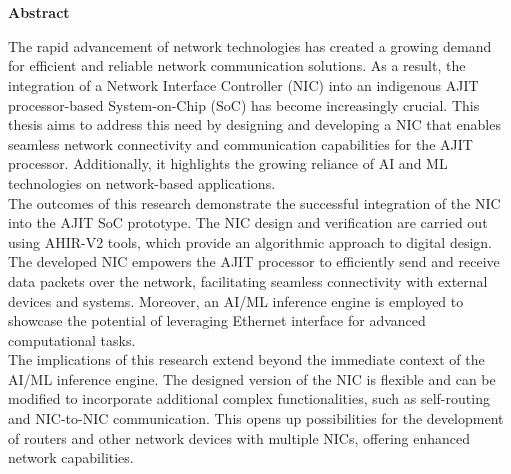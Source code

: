 \documentclass[12pt]{report}
\begin{document}
\newpage
\chapter*{}
\begin{center}
{\Large \textbf{Abstract}}
\end{center}
The rapid advancement of network technologies has created a growing demand for efficient and reliable network communication solutions. As a result, the integration of a Network Interface Controller (NIC) into an indigenous AJIT processor-based System-on-Chip (SoC) has become increasingly crucial. This thesis aims to address this need by designing and developing a NIC that enables seamless network connectivity and communication capabilities for the AJIT processor. Additionally, it highlights the growing reliance of AI and ML technologies on network-based applications.\\

The outcomes of this research demonstrate the successful integration of the NIC into the AJIT SoC prototype. The NIC design and verification are carried out using AHIR-V2 tools, which provide an algorithmic approach to digital design. The developed NIC empowers the AJIT processor to efficiently send and receive data packets over the network, facilitating seamless connectivity with external devices and systems. Moreover, an AI/ML inference engine is employed to showcase the potential of leveraging Ethernet interface for advanced computational tasks.\\

The implications of this research extend beyond the immediate context of the AI/ML inference engine. The designed version of the NIC is flexible and can be modified to incorporate additional complex functionalities, such as self-routing and NIC-to-NIC communication. This opens up possibilities for the development of routers and other network devices with multiple NICs, offering enhanced network capabilities.\\
\par
 
\tableofcontents
\newpage
\listoffigures
\listoftables



\newpage

\clearpage
{}
\end{document}
